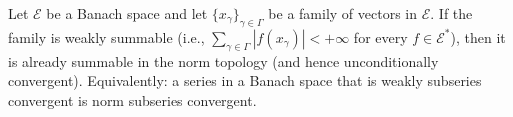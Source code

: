 Let $\mathcal{E}$ be a Banach space and let $\{x_\gamma\}_{\gamma \in \Gamma}$ be a family of vectors in $\mathcal{E}$. If the family is weakly summable (i.e., $\sum_{\gamma \in \Gamma} |f(x_\gamma)| < +\infty$ for every $f \in \mathcal{E}^*$), then it is already summable in the norm topology (and hence unconditionally convergent). Equivalently: a series in a Banach space that is weakly subseries convergent is norm subseries convergent.
